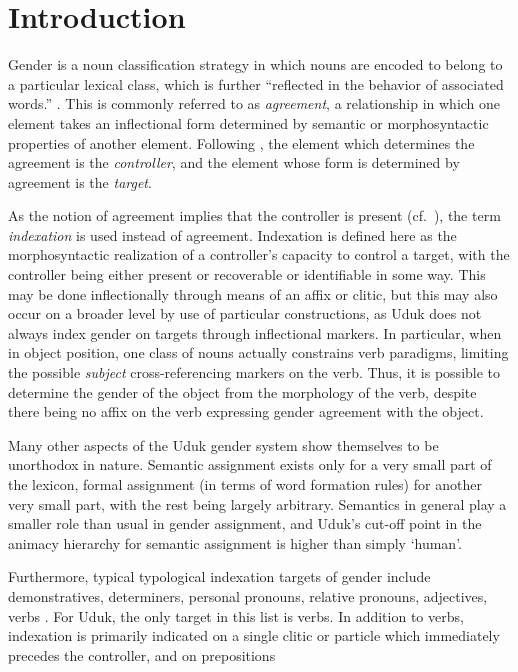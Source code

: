 \documentclass[output=collectionpaper,hidelinks]{langscibook}
\theoremstyle{remark}
\begin{document}
\section{Introduction}
\label{sec:Introduction}


Gender is a noun classification strategy in which nouns are encoded to belong to
a particular lexical class, which is further ``reflected in the behavior of
associated words.'' \citep[231]{Hockett1958}. This is commonly referred to as
\emph{agreement}, a relationship in which one element takes an inflectional form
determined by semantic or morphosyntactic properties of another element.
Following \cite{Corbett2006}, the element which determines the agreement is the
\emph{controller}, and the element whose form is determined by agreement is the
\emph{target}.

As the notion of agreement implies that the controller is present (cf.\
\citealt{Corbett2006}), the term \emph{indexation} is used instead of agreement.
Indexation is defined here as the morphosyntactic realization of a controller's
capacity to control a target, with the controller being either present or
recoverable or identifiable in some way.  This may be done inflectionally
through means of an affix or clitic, but this may also occur on a broader level
by use of particular constructions, as Uduk does not always index gender on
targets through inflectional markers.  In particular, when in object position,
one class of nouns actually constrains verb paradigms, limiting the possible
\emph{subject} cross-referencing markers on the verb. Thus, it is possible to determine the gender of the object from the morphology of the verb, despite there being no affix on the verb expressing gender agreement with the object.

Many other aspects of the Uduk gender system show themselves to be unorthodox in
nature. Semantic assignment exists only for a very small part of the lexicon,
formal assignment (in terms of word formation rules) for another very small
part, with the rest being largely arbitrary. Semantics in general play a smaller
role than usual in gender assignment, and Uduk's cut-off point in the animacy
hierarchy for semantic assignment is higher than simply `human'.

Furthermore, typical typological indexation targets of gender include
demonstratives, determiners, personal pronouns, relative pronouns, adjectives,
verbs \citep{DiGarbo2014}. For Uduk, the only target in this list is verbs. In addition to verbs, indexation is primarily indicated on a single clitic or particle which immediately precedes the controller, and on prepositions
\end{document}
